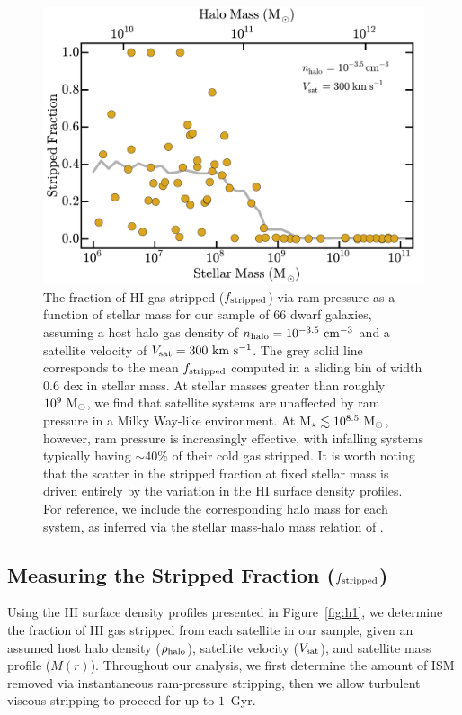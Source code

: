 \begin{figure}
 \centering
 \hspace*{-0.2in}
 \includegraphics[width=6.0in]{underpressure/f3.pdf}
 \caption[Ram Pressure stripping efficiency for MW-like host]{The fraction of H{\scriptsize I} gas stripped ($f_{\rm
     stripped}$) via ram pressure as a function of stellar mass for
   our sample of $66$ dwarf galaxies, assuming a host halo gas density
   of $n_{\rm halo} = 10^{-3.5}~{\rm cm}^{-3}$ and a satellite
   velocity of $V_{\rm sat}=300~{\rm km}~{\rm s}^{-1}$. The grey solid
   line corresponds to the mean $f_{\rm stripped}$ computed in a
   sliding bin of width $0.6$ dex in stellar mass. At stellar masses
   greater than roughly $10^{9}~{\rm M}_{\odot}$, we find that satellite systems
   are unaffected by ram pressure in a Milky Way-like environment. At
   ${\rm M}_{\star} \lesssim 10^{8.5}~{\rm M}_{\odot}$, however, ram pressure is
   increasingly effective, with infalling systems typically having
   $\sim 40\%$ of their cold gas stripped. It is worth noting that the
   scatter in the stripped fraction at fixed stellar mass is driven
   entirely by the variation in the H{\scriptsize I} surface density
   profiles. For reference, we include
   the corresponding halo mass for each system, as inferred via the
   stellar mass-halo mass relation of \citet{gk14}.}
\label{fig:fid}
\end{figure}


\subsection{Measuring the Stripped Fraction (\boldmath$f_{\rm stripped}$)}
\label{subsec:frac} 
Using the H{\scriptsize I} surface density profiles presented in
Figure~\ref{fig:h1}, we determine the fraction of H{\scriptsize I} gas
stripped from each satellite in our sample, given an assumed host halo
density ($\rho_{\rm halo}$), satellite velocity ($V_{\rm sat}$), and
satellite mass profile ($M(r)$).
%
Throughout our analysis, we first determine the amount of ISM removed
via instantaneous ram-pressure stripping, then we allow turbulent
viscous stripping to proceed for up to $1$~Gyr.

